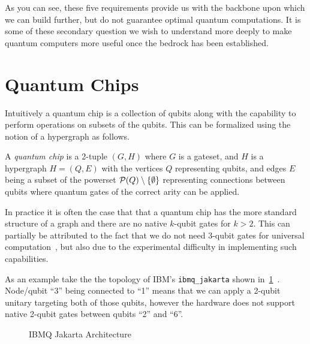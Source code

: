 As you can see, these five requirements provide us with the backbone upon which we can build further, but do not guarantee optimal quantum computations.
It is some of these secondary question we wish to understand more deeply to make quantum computers more useful once the bedrock has been established.

\section{Quantum Chips}

Intuitively a quantum chip is a collection of qubits along with the capability to perform operations on subsets of the qubits.
This can be formalized using the notion of a hypergraph as follows.
\begin{definition}
    A \emph{quantum chip} is a 2-tuple $(G, H)$ where $G$ is a gateset, and $H$ is a hypergraph $H = (Q, E)$ with the vertices $Q$ representing qubits, and edges $E$ being a subset of the powerset $\mathcal{P}(Q) \setminus \qty{\emptyset}$ representing connections between qubits where quantum gates of the correct arity can be applied.
\end{definition}
In practice it is often the case that that a quantum chip has the more standard structure of a graph and there are no native $k$-qubit gates for $k > 2$.
This can partially be attributed to the fact that we do not need 3-qubit gates for universal computation~\cite{universal-cnot-u2}, but also due to the experimental difficulty in implementing such capabilities.

As an example take the the topology of IBM's \texttt{ibmq\_jakarta} shown in~\cref{fig:ibm-jakarta}~\cite{ibmq}.
Node/qubit ``3'' being connected to ``1'' means that we can apply a 2-qubit unitary targeting both of those qubits, however the hardware does not support native 2-qubit gates between qubits ``2'' and ``6''.
\begin{figure}[ht]
    \centering
    
    \caption{IBMQ Jakarta Architecture}\label{fig:ibm-jakarta}
\end{figure}

